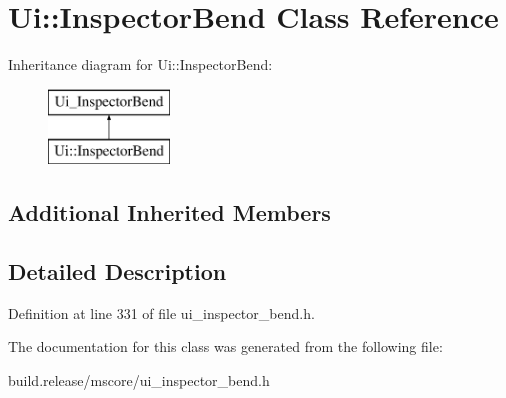 \hypertarget{class_ui_1_1_inspector_bend}{}\section{Ui\+:\+:Inspector\+Bend Class Reference}
\label{class_ui_1_1_inspector_bend}
Inheritance diagram for Ui\+:\+:Inspector\+Bend\+:\begin{figure}[H]
\begin{center}
\leavevmode
\includegraphics[height=2.000000cm]{class_ui_1_1_inspector_bend}
\end{center}
\end{figure}
\subsection*{Additional Inherited Members}


\subsection{Detailed Description}


Definition at line 331 of file ui\+\_\+inspector\+\_\+bend.\+h.



The documentation for this class was generated from the following file\+:\begin{DoxyCompactItemize}
\item 
build.\+release/mscore/ui\+\_\+inspector\+\_\+bend.\+h\end{DoxyCompactItemize}
